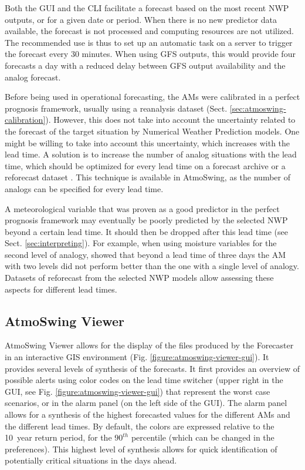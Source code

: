 \documentclass[review]{elsarticle}
\begin{document}
Both the GUI and the CLI facilitate a forecast based on the most recent NWP outputs, or for a given date or period. When there is no new predictor data available, the forecast is not processed and computing resources are not utilized. The recommended use is thus to set up an automatic task on a server to trigger the forecast every 30 minutes. When using GFS outputs, this would provide four forecasts a day with a reduced delay between GFS output availability and the analog forecast. 

Before being used in operational forecasting, the AMs were calibrated in a perfect prognosis framework, usually using a reanalysis dataset (Sect. \ref{sec:atmoswing-calibration}). However, this does not take into account the uncertainty related to the forecast of the target situation by Numerical Weather Prediction models. One might be willing to take into account this uncertainty, which increases with the lead time. A solution is to increase the number of analog situations with the lead time, which should be optimized for every lead time on a forecast archive or a reforecast dataset \citep{Thevenot2004}. This technique is available in AtmoSwing, as the number of analogs can be specified for every lead time.

A meteorological variable that was proven as a good predictor in the perfect prognosis framework may eventually be poorly predicted by the selected NWP beyond a certain lead time. It should then be dropped after this lead time (see Sect. \ref{sec:interpreting}). For example, when using moisture variables for the second level of analogy, \citet{Thevenot2004} showed that beyond a lead time of three days the AM with two levels did not perform better than the one with a single level of analogy. Datasets of reforecast from the selected NWP models allow assessing these aspects for different lead times.


\subsection{AtmoSwing Viewer}
\label{sec:viewer}

AtmoSwing Viewer allows for the display of the files produced by the Forecaster in an interactive GIS environment (Fig. \ref{figure:atmoswing-viewer-gui}). It provides several levels of synthesis of the forecasts. It first provides an overview of possible alerts using color codes on the lead time switcher (upper right in the GUI, see Fig. \ref{figure:atmoswing-viewer-gui}) that represent the worst case scenarios, or in the alarm panel (on the left side of the GUI). The alarm panel allows for a synthesis of the highest forecasted values for the different AMs and the different lead times. By default, the colors are expressed relative to the 10~year return period, for the $90^{th}$ percentile (which can be changed in the preferences). This highest level of synthesis allows for quick identification of potentially critical situations in the days ahead.
\end{document}
